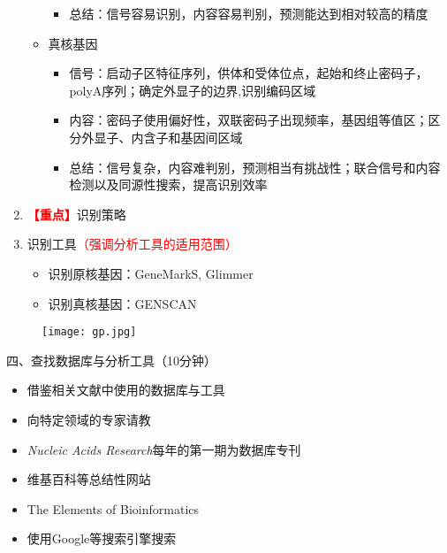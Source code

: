 \documentclass{TIJMUjiaoanLL}
\begin{document}
\begin{enumerate}
\begin{itemize}
\begin{itemize}
	  \item 总结：信号容易识别，内容容易判别，预测能达到相对较高的精度
	\end{itemize}
      \item 真核基因
	\begin{itemize}
	  \item 信号：启动子区特征序列，供体和受体位点，起始和终止密码子，polyA序列；确定外显子的边界,识别编码区域
	  \item 内容：密码子使用偏好性，双联密码子出现频率，基因组等值区；区分外显子、内含子和基因间区域
	  \item 总结：信号复杂，内容难判别，预测相当有挑战性；联合信号和内容检测以及同源性搜索，提高识别效率
	\end{itemize}
    \end{itemize}
  \item \textcolor{red}{\textbf{【重点】}}识别策略
  \item 识别工具\textcolor{red}{（强调分析工具的适用范围）}
    \begin{itemize}
      \item 识别原核基因：GeneMarkS, Glimmer
      \item 识别真核基因：GENSCAN
    \end{itemize}
\end{enumerate}


\otherTail
\newpage
\otherHeader

    \begin{figure}[h]
      \centering
      \texttt{[image: gp.jpg]}
    \end{figure}

\noindent
四、查找数据库与分析工具（10分钟）
\begin{itemize}
  \item 借鉴相关文献中使用的数据库与工具
  \item 向特定领域的专家请教
  \item \textit{Nucleic Acids Research}每年的第一期为数据库专刊
  \item 维基百科等总结性网站
  \item The Elements of Bioinformatics
  \item 使用Google等搜索引擎搜索
\end{itemize}
\end{document}
